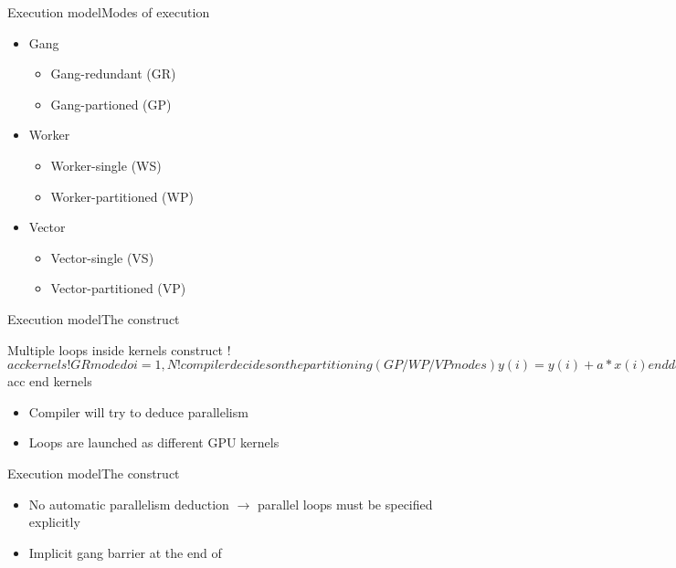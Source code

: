 \documentclass[12pt,aspectratio=169]{beamer}
\begin{document}
\begin{frame}{Execution model}{Modes of execution}
  \begin{itemize}
  \item Gang
    \begin{itemize}
    \item Gang-redundant (GR)
    \item Gang-partioned (GP)
    \end{itemize}
  \item Worker
    \begin{itemize}
    \item Worker-single (WS)
    \item Worker-partitioned (WP)
    \end{itemize}
  \item Vector
    \begin{itemize}
    \item Vector-single (VS)
    \item Vector-partitioned (VP)
    \end{itemize}
  \end{itemize}
\end{frame}

\begin{frame}[fragile]{Execution model}{The  construct}
  \begin{Fortranlisting}{Multiple loops inside kernels construct}
!$acc kernels
    !GR mode
    do i = 1, N
        !compiler decides on the partitioning (GP/WP/VP modes)
        y(i) = y(i) + a*x(i)
    enddo
    do i = 1, N
        !compiler decides on the partitioning (GP/WP/VP modes)
        y(i) = b*y(i) + a*x(i)
    enddo
!$acc end kernels
  \end{Fortranlisting}
  \begin{itemize}
  \item Compiler will try to deduce parallelism
  \item Loops are launched as different GPU kernels
  \end{itemize}
\end{frame}

\begin{frame}[fragile]{Execution model}{The  construct}
  \begin{itemize}
  \item No automatic parallelism deduction $\rightarrow$ parallel loops must
    be specified explicitly
  \item Implicit gang barrier at the end of 
  \end{itemize}
\end{frame}
\end{document}
